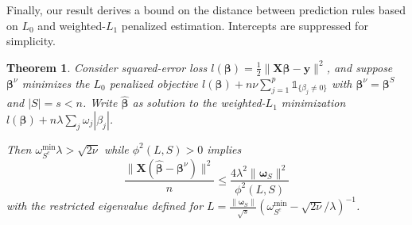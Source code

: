 \documentclass[12pt]{article}
\newtheorem{theorem}{\sc Theorem}[section]
\newcommand{\bs}[1]{\boldsymbol{#1}}
\newcommand{\mr}[1]{\mathrm{#1}}
\newcommand{\bm}[1]{\mathbf{#1}}
\newcommand{\ds}[1]{\mathds{#1}}
\begin{document}
Finally, our result derives a bound on the distance between prediction rules based on $L_0$ and weighted-$L_1$ penalized estimation.  Intercepts are suppressed for simplicity.
\begin{theorem} \label{sparseapprox}  Consider squared-error loss $l(\bs{\beta}) =
\frac{1}{2}\|\bm{X}\bs{\beta}-\bm{y}\|^2$, and suppose $\bs{\beta}^{\nu}$ minimizes the $L_0$ penalized objective $l(\bs{\beta}) + n\nu\sum_{j=1}^p\ds{1}_{\{\beta_j\neq0\}}$ with $\bs{\beta}^\nu = \bs{\beta}^S$ and $|S|=s<n$.   
Write $\bs{\hat\beta}$ as solution to the weighted-$L_1$ minimization $l(\bs{\beta}) + n\lambda\sum_j\omega_j|\beta_j|$. 

Then  
$\omega^{\mr{min}}_{S^c}\lambda > \sqrt{2\nu}$ while $\phi^2(L,S) > 0$ implies
\begin{equation} \label{sparseineq}
\frac{\|\bm{X}(\bs{\hat\beta}-\bs{\beta}^\nu)\|^2}{n}\leq
\frac{4\lambda^2 \|\bs{\omega}_S\|^2}{\phi^2(L, S)}
\end{equation} 
with the restricted eigenvalue defined for 
 $L = \frac{\|\bs{\omega}_S\|}{\sqrt{s}}\left(\omega^{\mr{min}}_{S^c}-\sqrt{2\nu}/\lambda\right)^{-1}$.
\end{theorem}
\end{document}
